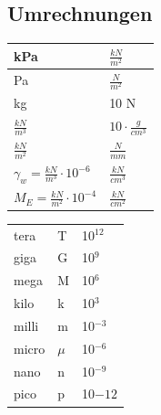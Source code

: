 \begin{minipage}{0.25\linewidth}	
	\subsection{Umrechnungen}
	\begin{tabular}{|l|l|}
		\hline
		kPa 				& $\frac{kN}{m^2}$ \\ \hline
		Pa					& $\frac{N}{m^2}$  \\ \hline
		kg					& 10 N				\\ \hline
		$\frac{kN}{m^3}$	& $10 \cdot \frac{g}{cm^3}$ \\ \hline
		$\frac{kN}{m^2}$	& $\frac{N}{mm}$	\\ \hline
		$\gamma_w=\frac{kN}{m^3}\cdot 10^{-6}$ & $\frac{kN}{cm^3}$ \\ \hline
		$M_E=\frac{kN}{m^2}\cdot 10^{-4}$ & $\frac{kN}{cm^2}$	\\ \hline
	\end{tabular}
\end{minipage}
\begin{minipage}{0.2\linewidth}
	
	\begin{tabular}{lll}
		
		tera	& T & 10$^{12}$ \\
		
		giga	& G & 10$^9$ \\
		
		mega	& M & 10$^6$ \\
		
		kilo	& k & 10$^3$ \\
		
		milli	& m & 10$^{-3}$ \\
		
		micro	& $\mu$ & 10$^{-6}$ \\
		
		nano	& n & 10$^{-9}$ \\
		
		pico	& p & 10${-12}$ \\
		
	\end{tabular}
	
\end{minipage}
